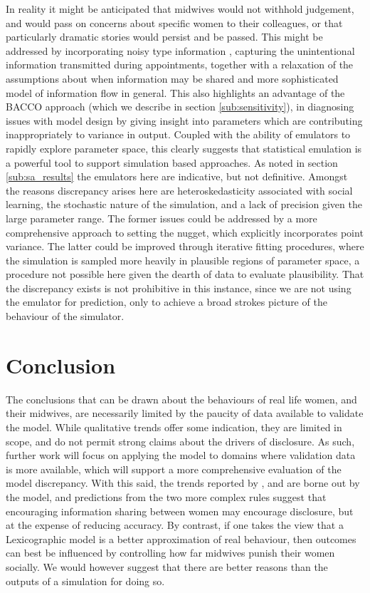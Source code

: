 \documentclass[graybox]{svmult}
\begin{document}
In reality it might be anticipated that midwives would not withhold judgement, and would pass on concerns about specific women to their colleagues, or that particularly dramatic stories would persist and be passed. This might be addressed by incorporating noisy type information \citep{Feltovich2002}, capturing the unintentional information transmitted during appointments, together with a relaxation of the assumptions about when information may be shared and more sophisticated model of information flow in general. This also highlights an advantage of the \ac{BACCO} approach (which we describe in section \ref{sub:sensitivity}), in diagnosing issues with model design by giving insight into parameters which are contributing inappropriately to variance in output. Coupled with the ability of emulators to rapidly explore parameter space, this clearly suggests that statistical emulation is a powerful tool to support simulation based approaches.
As noted in section \ref{sub:sa_results} the emulators here are indicative, but not definitive. Amongst the reasons discrepancy arises here are heteroskedasticity associated with social learning, the stochastic nature of the simulation, and a lack of precision given the large parameter range. The former issues could be addressed by a more comprehensive approach to setting the nugget, which explicitly incorporates point variance.  The latter could be improved through iterative fitting procedures, where the simulation is sampled more heavily in plausible regions of parameter space, a procedure not possible here given the dearth of data to evaluate plausibility. That the discrepancy exists is not prohibitive in this instance, since we are not using the emulator for prediction, only to achieve a broad strokes picture of the behaviour of the simulator.

\section{Conclusion}
\label{sec:conclusion}

The conclusions that can be drawn about the behaviours of real life women, and their midwives, are necessarily limited by the paucity of data available to validate the model. While qualitative trends offer some indication, they are limited in scope, and do not permit strong claims about the drivers of disclosure.  As such, further work will focus on applying the model to domains where validation data is more available, which will support a more comprehensive evaluation of the model discrepancy. 
With this said, the trends reported by \citet{Alvik2006}, and \citet{Phillips2007} are borne out by the model, and predictions from the two more complex rules suggest that encouraging information sharing between women may encourage disclosure, but at the expense of reducing accuracy. By contrast, if one takes the view that a Lexicographic model is a better approximation of real behaviour, then outcomes can best be influenced by controlling how far midwives punish their women socially. We would however suggest that there are better reasons than the outputs of a simulation for doing so.
\end{document}
